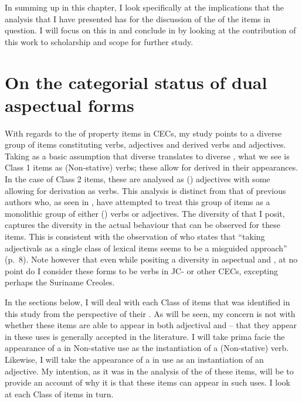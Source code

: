 In summing up in this chapter, I look specifically at the implications that the analysis that I have presented has for the discussion of the  of the items in question. I will focus on this in  and conclude in  by looking at the contribution of this work to scholarship and scope for further study. 

\section{On the categorial status of dual aspectual forms}\label{sec:6.1}
With regards to the  of property items in CECs, my study points to a diverse group of items constituting verbs, adjectives and derived verbs and adjectives. Taking as a basic assumption that diverse  translates to diverse , what we see is Class 1 items as (Non-stative) verbs; these allow for derived  in their  appearances. In the case of Class 2 items, these are analysed as () adjectives with some allowing for derivation as verbs. This analysis is distinct from that of previous authors who, as seen in , have attempted to treat this group of items as a monolithic group of either () verbs or adjectives. The diversity of  that I posit, captures the diversity in the actual behaviour that can be observed for these items. This is consistent with the observation of \citet{Kouwenberg1996} who states that ``taking adjectivals as a single class of lexical items seems to be a misguided approach” (p.~8). Note however that even while positing a diversity in aspectual and , at no point do I consider these forms to be  verbs in JC- or other CECs, excepting perhaps the Suriname Creoles. 

In the sections below, I will deal with each Class of items that was identified in this study from the perspective of their . As will be seen, my concern is not with whether these items are able to appear in both adjectival and  -- that they appear in these uses is generally accepted in the literature. I will take prima facie the appearance of a  in Non-stative use as the instantiation of a (Non-stative) verb. Likewise, I will take the appearance of a  in  use as an instantiation of an adjective. My intention, as it was in the analysis of the  of these items, will be to provide an account of why it is that these items can appear in such uses. I look at each Class of items in turn.

